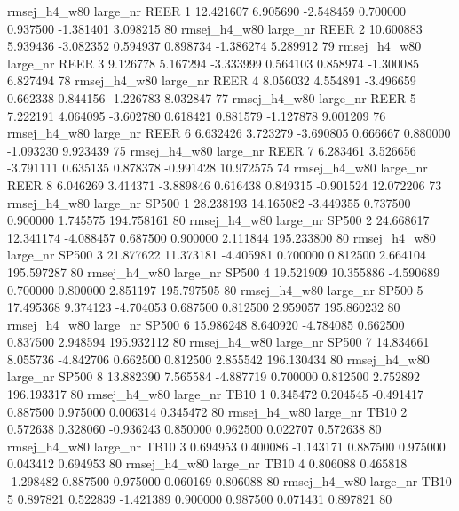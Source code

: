 rmsej_h4_w80   large_nr     REER                 1 12.421607  6.905690  -2.548459 0.700000 0.937500 -1.381401    3.098215 80
rmsej_h4_w80   large_nr     REER                 2 10.600883  5.939436  -3.082352 0.594937 0.898734 -1.386274    5.289912 79
rmsej_h4_w80   large_nr     REER                 3  9.126778  5.167294  -3.333999 0.564103 0.858974 -1.300085    6.827494 78
rmsej_h4_w80   large_nr     REER                 4  8.056032  4.554891  -3.496659 0.662338 0.844156 -1.226783    8.032847 77
rmsej_h4_w80   large_nr     REER                 5  7.222191  4.064095  -3.602780 0.618421 0.881579 -1.127878    9.001209 76
rmsej_h4_w80   large_nr     REER                 6  6.632426  3.723279  -3.690805 0.666667 0.880000 -1.093230    9.923439 75
rmsej_h4_w80   large_nr     REER                 7  6.283461  3.526656  -3.791111 0.635135 0.878378 -0.991428   10.972575 74
rmsej_h4_w80   large_nr     REER                 8  6.046269  3.414371  -3.889846 0.616438 0.849315 -0.901524   12.072206 73
rmsej_h4_w80   large_nr    SP500                 1 28.238193 14.165082  -3.449355 0.737500 0.900000  1.745575  194.758161 80
rmsej_h4_w80   large_nr    SP500                 2 24.668617 12.341174  -4.088457 0.687500 0.900000  2.111844  195.233800 80
rmsej_h4_w80   large_nr    SP500                 3 21.877622 11.373181  -4.405981 0.700000 0.812500  2.664104  195.597287 80
rmsej_h4_w80   large_nr    SP500                 4 19.521909 10.355886  -4.590689 0.700000 0.800000  2.851197  195.797505 80
rmsej_h4_w80   large_nr    SP500                 5 17.495368  9.374123  -4.704053 0.687500 0.812500  2.959057  195.860232 80
rmsej_h4_w80   large_nr    SP500                 6 15.986248  8.640920  -4.784085 0.662500 0.837500  2.948594  195.932112 80
rmsej_h4_w80   large_nr    SP500                 7 14.834661  8.055736  -4.842706 0.662500 0.812500  2.855542  196.130434 80
rmsej_h4_w80   large_nr    SP500                 8 13.882390  7.565584  -4.887719 0.700000 0.812500  2.752892  196.193317 80
rmsej_h4_w80   large_nr     TB10                 1  0.345472  0.204545  -0.491417 0.887500 0.975000  0.006314    0.345472 80
rmsej_h4_w80   large_nr     TB10                 2  0.572638  0.328060  -0.936243 0.850000 0.962500  0.022707    0.572638 80
rmsej_h4_w80   large_nr     TB10                 3  0.694953  0.400086  -1.143171 0.887500 0.975000  0.043412    0.694953 80
rmsej_h4_w80   large_nr     TB10                 4  0.806088  0.465818  -1.298482 0.887500 0.975000  0.060169    0.806088 80
rmsej_h4_w80   large_nr     TB10                 5  0.897821  0.522839  -1.421389 0.900000 0.987500  0.071431    0.897821 80

